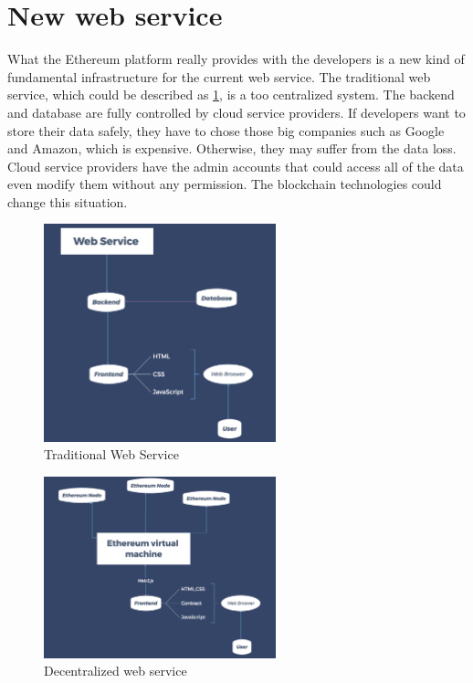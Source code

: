 \documentclass{ecsthesis}      %
\begin{document}
\section{New web service}
What the Ethereum platform really provides with the developers is a new kind of fundamental infrastructure for the current web service.
The traditional web service, which could be described as \ref{service}, is a too centralized system.
The backend and database are fully controlled by cloud service providers. If developers want to store their data safely, 
they have to chose those big companies such as Google and Amazon, which is expensive. 
Otherwise, they may suffer from the data loss. 
Cloud service providers have the admin accounts that could access all of the data even modify them without any permission.
The blockchain technologies could change this situation.
\begin{figure}[H]
  \centering
  \includegraphics[width=0.6\textwidth]{triditionalWebService.png}
  \caption{Traditional Web Service}
  \label{service} 
\end{figure} 
\begin{figure}[H]
  \centering
  \includegraphics[width=0.6\textwidth]{EthereumWeb.png}
  \caption{Decentralized web service}
  \label{newservice} 
\end{figure}
\end{document}
